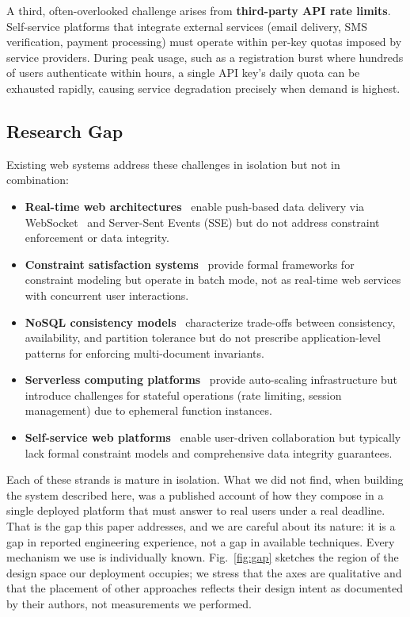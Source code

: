 \documentclass[11pt,a4paper]{article}
\theoremstyle{plain}
\theoremstyle{definition}
\theoremstyle{remark}
\begin{document}
A third, often-overlooked challenge arises from \textbf{third-party API rate limits}. Self-service platforms that integrate external services (email delivery, SMS verification, payment processing) must operate within per-key quotas imposed by service providers. During peak usage, such as a registration burst where hundreds of users authenticate within hours, a single API key's daily quota can be exhausted rapidly, causing service degradation precisely when demand is highest.

\subsection{Research Gap}

Existing web systems address these challenges in isolation but not in combination:

\begin{itemize}[noitemsep,topsep=4pt]
    \item \textbf{Real-time web architectures}~\cite{pimentel2012, lubbers2010} enable push-based data delivery via WebSocket~\cite{wang2013} and Server-Sent Events (SSE) but do not address constraint enforcement or data integrity.
    \item \textbf{Constraint satisfaction systems}~\cite{rossi2006, kumar1992} provide formal frameworks for constraint modeling but operate in batch mode, not as real-time web services with concurrent user interactions.
    \item \textbf{NoSQL consistency models}~\cite{brewer2000, gilbert2002, decandia2007} characterize trade-offs between consistency, availability, and partition tolerance but do not prescribe application-level patterns for enforcing multi-document invariants.
    \item \textbf{Serverless computing platforms}~\cite{jonas2017, baldini2017, schleier-smith2021} provide auto-scaling infrastructure but introduce challenges for stateful operations (rate limiting, session management) due to ephemeral function instances.
    \item \textbf{Self-service web platforms}~\cite{bafoutsou2002, olson2000} enable user-driven collaboration but typically lack formal constraint models and comprehensive data integrity guarantees.
\end{itemize}

Each of these strands is mature in isolation. What we did not find, when building the system described here, was a published account of how they compose in a single deployed platform that must answer to real users under a real deadline. That is the gap this paper addresses, and we are careful about its nature: it is a gap in reported engineering experience, not a gap in available techniques. Every mechanism we use is individually known. Fig.~\ref{fig:gap} sketches the region of the design space our deployment occupies; we stress that the axes are qualitative and that the placement of other approaches reflects their design intent as documented by their authors, not measurements we performed.
\end{document}
